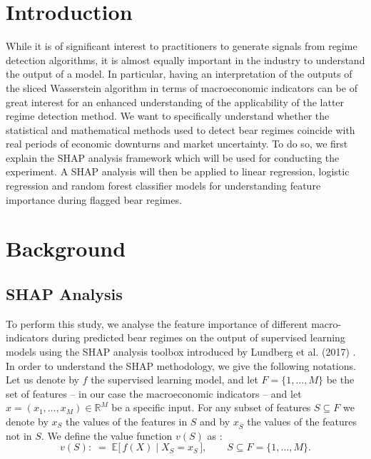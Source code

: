 \documentclass[12pt,a4paper]{report}
\begin{document}
\section{Introduction}
While it is of significant interest to practitioners to generate signals from regime detection algorithms, it is almost equally important in the industry to
understand the output of a model. 
In particular, having an interpretation of the outputs of the sliced Wasserstein algorithm in terms of macroeconomic indicators can be of great interest for an enhanced understanding of the applicability of the latter regime detection method. 
We want to specifically understand whether the statistical and mathematical methods used to detect bear regimes coincide with real periods of economic downturns and market uncertainty. 
To do so, we first explain the SHAP analysis framework which will be used for conducting the experiment. 
A SHAP analysis will then be applied to linear regression, logistic regression and random forest classifier models for understanding feature importance during 
flagged bear regimes. 


\section{Background}
\subsection{SHAP Analysis}
To perform this study, we  analyse the feature importance of different macro-indicators during predicted bear regimes on the output of supervised learning models using the SHAP analysis toolbox introduced by Lundberg et al. (2017) \cite{lundberg2017unified}.
In order to understand the SHAP methodology, we give the following notations.
Let us denote by $f$ the supervised learning model, and let $F = \{1,\dots,M\}$ be the set of features -- in our case the macroeconomic indicators -- and let $x = \left(x_1, \dots, x_M\right) \in \mathbb{R}^M $ be a specific input. 
For any subset of features $S \subseteq F$ we denote by $x_S$ the values of the features in $S$ and by $x_{\bar{S}}$ the values of the features not in $S$.
We define the value function $v(S)$ as : 
\begin{equation}
  v(S) :\;=\; \mathbb{E}\big[\,f(X)\mid X_S = x_S\,\big], 
  \qquad S \subseteq F = \{1,\dots,M\}.
  \label{eq:shap-value-function}
\end{equation}
\cite{lundberg2017unified}
\end{document}
